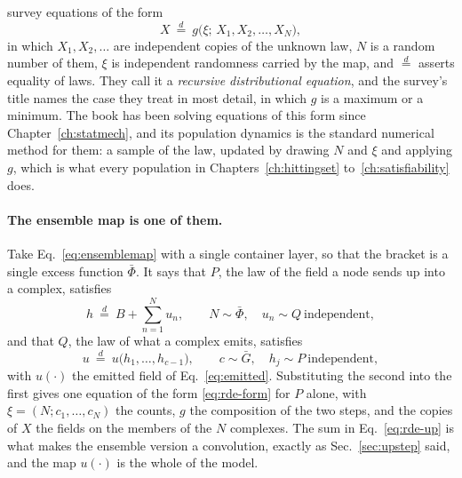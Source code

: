 \citet{aldous2005} survey equations of the form
\begin{equation}
  X\ \stackrel{d}{=}\ g\bigl(\xi;\,X_{1},X_{2},\dots,X_{N}\bigr),
  \label{eq:rde-form}
\end{equation}
in which $X_{1},X_{2},\dots$ are independent copies of the unknown law, $N$
is a random number of them, $\xi$ is independent randomness carried by the
map, and $\stackrel{d}{=}$ asserts equality of laws. They call it a
\emph{recursive distributional equation}, and the survey's title names the
case they treat in most detail, in which $g$ is a maximum or a minimum. The
book has been solving equations of this form since Chapter~\ref{ch:statmech},
and its population dynamics is the standard numerical method for them: a
sample of the law, updated by drawing $N$ and $\xi$ and applying $g$, which
is what every population in Chapters~\ref{ch:hittingset}
to~\ref{ch:satisfiability} does.

\paragraph{The ensemble map is one of them.} Take Eq.~\eqref{eq:ensemblemap}
with a single container layer, so that the bracket is a single excess
function $\bar\Phi$. It says that $P$, the law of the field a node sends up
into a complex, satisfies
\begin{equation}
  h\ \stackrel{d}{=}\ B+\sum_{n=1}^{N}u_{n},
  \qquad N\sim\bar\Phi,\quad u_{n}\sim Q\ \text{independent},
  \label{eq:rde-up}
\end{equation}
and that $Q$, the law of what a complex emits, satisfies
\begin{equation}
  u\ \stackrel{d}{=}\ u\bigl(h_{1},\dots,h_{c-1}\bigr),
  \qquad c\sim\bar G,\quad h_{j}\sim P\ \text{independent},
  \label{eq:rde-down}
\end{equation}
with $u(\cdot)$ the emitted field of Eq.~\eqref{eq:emitted}. Substituting
the second into the first gives one equation of the form
\eqref{eq:rde-form} for $P$ alone, with $\xi=(N;c_{1},\dots,c_{N})$ the
counts, $g$ the composition of the two steps, and the copies of $X$ the
fields on the members of the $N$ complexes. The sum in Eq.~\eqref{eq:rde-up}
is what makes the ensemble version a convolution, exactly as
Sec.~\ref{sec:upstep} said, and the map $u(\cdot)$ is the whole of the
model.

